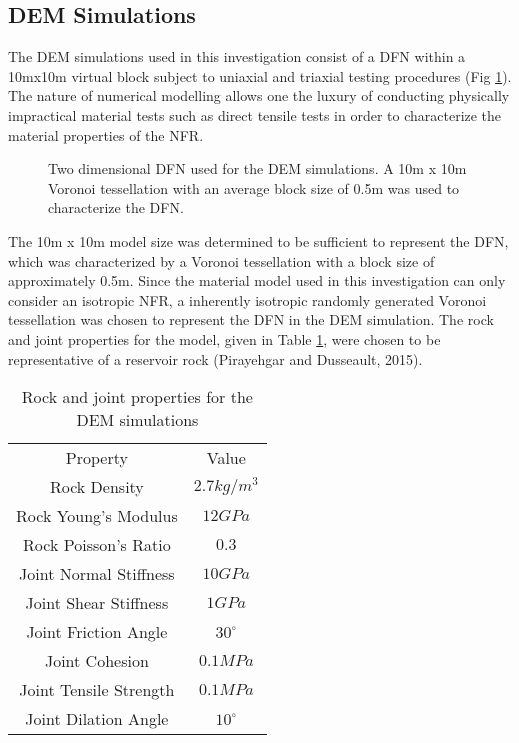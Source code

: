 \subsection{DEM Simulations}

The DEM simulations used in this investigation consist of a DFN within
a 10mx10m virtual block subject to uniaxial and triaxial testing
procedures (Fig \ref{fig:vorDFN}). The nature of numerical modelling
allows one the luxury of conducting physically impractical material
tests such as direct tensile tests in order to characterize the material
properties of the NFR.

\begin{figure}
\label{fig:vorDFN} \caption{Two dimensional DFN used for the DEM simulations. A 10m x 10m Voronoi
tessellation with an average block size of 0.5m was used to characterize
the DFN.}
\end{figure}


The 10m x 10m model size was determined to be sufficient to represent
the DFN, which was characterized by a Voronoi tessellation with a
block size of approximately 0.5m. Since the material model used in
this investigation can only consider an isotropic NFR, a inherently
isotropic randomly generated Voronoi tessellation was chosen to represent
the DFN in the DEM simulation. The rock and joint properties for the
model, given in Table \ref{tab:demProp}, were chosen to be representative
of a reservoir rock (Pirayehgar and Dusseault, 2015).

\begin{table}[!htbp]
\centering \caption{Rock and joint properties for the DEM simulations}
\label{tab:demProp} %
\begin{tabular}{c c}
Property  & Value \\
Rock Density  & $2.7kg/m^{3}$ \\
Rock Young's Modulus  & $12GPa$ \\
Rock Poisson's Ratio  & $0.3$ \\
Joint Normal Stiffness  & $10GPa$ \\
Joint Shear Stiffness  & $1GPa$ \\
Joint Friction Angle  & $30^{\circ}$ \\
Joint Cohesion  & $0.1MPa$ \\
Joint Tensile Strength  & $0.1MPa$ \\
Joint Dilation Angle  & $10^{\circ}$
\end{tabular}
\end{table}


